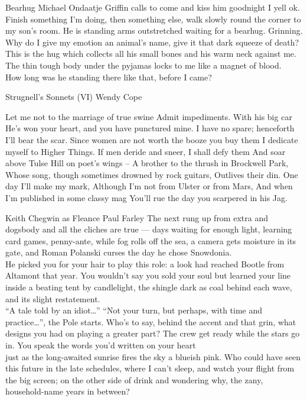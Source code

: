 \begin{poem}
  {Bearhug}
  {Michael Ondaatje}
 Griffin calls to come and kiss him goodnight
 I yell ok. Finish something I'm doing,
 then something else, walk slowly round
 the corner to my son's room.
 He is standing arms outstretched
 waiting for a bearhug. Grinning.\\
 
 Why do I give my emotion an animal's name,
 give it that dark squeeze of death?
 This is the hug which collects
 all his small bones and his warm neck against me.
 The thin tough body under the pyjamas
 locks to me like a magnet of blood.\\
 
 How long was he standing there
 like that, before I came?
\end{poem}

\begin{poem}
   {Strugnell's Sonnets (VI)}
   {Wendy Cope}

 Let me not to the marriage of true swine
 Admit impediments. With his big car
 He's won your heart, and you have punctured mine. 
 I have no spare; henceforth I'll bear the scar.
 Since women are not worth the booze you buy them
 I dedicate myself to Higher Things. 
 If men deride and sneer, I shall defy them
 And soar above Tulse Hill on poet's wings -- 
 A brother to the thrush in Brockwell Park,
 Whose song, though sometimes drowned by rock guitars,
 Outlives their din. One day I'll make my mark,
 Although I'm not from Ulster or from Mars,
 And when I'm published in some classy mag
 You'll rue the day you scarpered in his Jag.
\end{poem}

\begin{poem}
{Keith Chegwin as Fleance}
{Paul Farley}
The next rung up from extra and dogsbody
and all the cliches are true --- days waiting for 
enough light, learning card games, penny-ante,
 while fog rolls off the sea, a camera 
gets moisture in its gate, and Roman Polanski 
curses the day he chose Snowdonia.\\

He picked you for your hair to play this role:
 a look had reached Bootle from Altamont 
that year. You wouldn't say you sold your soul 
but learned your line inside a beating tent 
by candlelight, the shingle dark as coal
 behind each wave, and its slight restatement.\\

``A tale told by an idiot\ldots'' ``Not your turn, 
but perhaps, with time and practice\ldots'', the Pole starts. 
Who's to say, behind the accent and that grin, 
what designs you had on playing a greater part? 
The crew get ready while the stars go in. 
You speak the words you'd written on your heart\\

just as the long-awaited sunrise fires 
the sky a blueish pink. Who could have seen 
this future in the late schedules, where I 
can't sleep, and watch your flight from the big screen; 
on the other side of drink and wondering why,
the zany, household-name years in between?
\end{poem}

